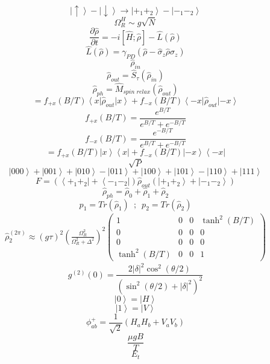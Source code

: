 \documentclass[12pt]{article}
\begin{document}
\begin{large}
\[\]
\[
    \left| \uparrow \right> - \left| \downarrow \right> \rightarrow \left| +_1 +_2 \right> - \left| -_1 -_2 \right>
\]
\[
    \Omega^H_R \sim g \sqrt{N}
\]
\[
     \frac{\partial \hat{\rho} }{\partial t} = -i \left[ \hat{H} ; \hat{\rho} \right] - \hat{L}(\hat{\rho})
\]
\[
    \hat{L}(\hat{\rho}) = \gamma_{PD} \left( \hat{\rho} - \hat{\sigma}_z \hat{\rho} \hat{\sigma}_z \right)
\]
\[
    \hat{\rho}_{in}
\]
\[
    \hat{\rho}_{out} = \hat{S}_{\tau} \left( \hat{\rho}_{in} \right)
\]
\[
    \hat{\rho}_{ph} = \hat{M}_{spin \,\, relax} \left(  \hat{\rho}_{out}  \right)
\]
\[
    = f_{+x}\left( B/T \right) \left< x \right| \hat{\rho}_{out} \left| x \right> + f_{-x}\left( B/T \right) \left< -x \right| \hat{\rho}_{out} \left| -x \right>
\]
\[
    f_{+x}\left( B/T \right) = \frac{e^{B/T}}{e^{B/T} + e^{-B/T}}
\]
\[
    f_{-x}\left( B/T \right) = \frac{e^{-B/T}}{e^{B/T} + e^{-B/T}}
\]
\[
    = f_{+x}\left( B/T \right) \left| x \right> \left< x \right|  + f_{-x}\left( B/T \right)  \left| -x \right> \left< -x \right|
\]
\[
    \sqrt{P}
\]
\[
    \left| 000 \right> + \left| 001 \right> + \left| 010 \right> - \left| 011 \right> + \left| 100 \right> + \left| 101 \right> - \left| 110 \right> + \left| 111 \right>
\]
\[
    F =\left( \left< +_1 +_2 \right| + \left< -_1 -_2 \right| \right) \hat{\rho}_{out}  \left( \left| +_1 +_2 \right> + \left| -_1 -_2 \right> \right)
\]
\[
    \hat{\rho}_{ph} = \hat{\rho}_{0} + \hat{\rho}_{1} + \hat{\rho}_{2}
\]
\[
    p_1 = Tr\left( \hat{\rho}_{1} \right) \, \, \, ; \, \, \, p_2 = Tr\left( \hat{\rho}_{2} \right)
\]
\begin{gather*}
    \hat{\rho}^{(2\pi)}_2 \approx \left( g \tau \right)^2 \left( \frac{ \Omega_R^2}{ \Omega_R^2 + \Delta^2} \right)^2
\begin{pmatrix}
    1 & 0 & 0 & \tanh^2\left( B/T \right) \\
    0 & 0 & 0 & 0 \\
    0 & 0 & 0 & 0 \\
    \tanh^2\left( B/T \right) & 0 & 0 & 1
\end{pmatrix}
\end{gather*}
\[
    g^{(2)}(0) = \frac{2\left| \delta \right|^2 \cos^2(\theta/2)}{\left( \sin^2(\theta/2) + \left| \delta \right|^2 \right)^2}
\]
\[
    \left| 0 \right> = \left| H \right>
\]
\[
    \left| 1 \right> = \left| V \right>
\]
\[
    \phi_{ab}^+ = \frac{1}{\sqrt{2}} \left(  H_a H_b +  V_a V_b \right)
\]
\[
    \frac{\mu g B}{T}
\]
\[
    E_t
\]
\par
\end{large}
\end{document}
